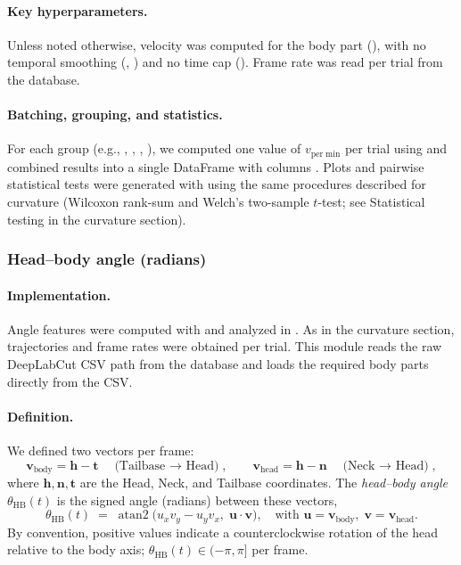 \paragraph{Key hyperparameters.}
Unless noted otherwise, velocity was computed for the  body part (), with no temporal smoothing (, ) and no time cap (). Frame rate was read per trial from the database.

\paragraph{Batching, grouping, and statistics.}
For each group (e.g., , , , ), we computed one value of $v_{\mathrm{per\;min}}$ per trial using  and combined results into a single DataFrame with columns . Plots and pairwise statistical tests were generated with  using the same procedures described for curvature (Wilcoxon rank-sum and Welch’s two-sample $t$-test; see Statistical testing in the curvature section).


\subsubsection{Head–body angle (radians)}

\paragraph{Implementation.}
Angle features were computed with \href{https://github.com/atanugiri/GhrelinBehaviorQuantification/blob/main/Python_scripts/Feature_functions/angle_features.py}{} and analyzed in \href{https://github.com/atanugiri/GhrelinBehaviorQuantification/blob/main/DLC-Jupyter-Notebooks/40_data_analysis_angle_features.ipynb}{}. As in the curvature section, trajectories and frame rates were obtained per trial. This module reads the raw DeepLabCut CSV path from the database and loads the required body parts directly from the CSV.

\paragraph{Definition.}
We defined two vectors per frame:
\[
\mathbf{v}_{\text{body}} = \mathbf{h} - \mathbf{t} \quad \text{(Tailbase $\to$ Head)}, 
\qquad
\mathbf{v}_{\text{head}} = \mathbf{h} - \mathbf{n} \quad \text{(Neck $\to$ Head)},
\]
where $\mathbf{h}, \mathbf{n}, \mathbf{t}$ are the Head, Neck, and Tailbase coordinates. The \emph{head–body angle} $\theta_{\mathrm{HB}}(t)$ is the signed angle (radians) between these vectors,
\[
\theta_{\mathrm{HB}}(t) \;=\; \operatorname{atan2}\!\big(u_x v_y - u_y v_x,\; \mathbf{u}\!\cdot\!\mathbf{v}\big),
\quad \text{with } \mathbf{u}=\mathbf{v}_{\text{body}},\; \mathbf{v}=\mathbf{v}_{\text{head}}.
\]
By convention, positive values indicate a counterclockwise rotation of the head relative to the body axis; $\theta_{\mathrm{HB}}(t)\in(-\pi,\pi]$ per frame.


